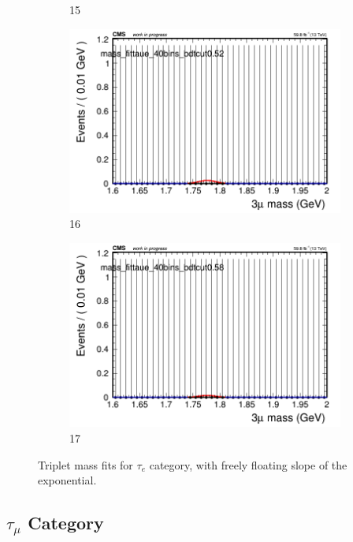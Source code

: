 \begin{figure}[h!]
\begin{subfigure}{0.2\textwidth}
        \caption{15}
    \end{subfigure}
    \begin{subfigure}{0.2\textwidth}
        \includegraphics[width=\textwidth]{power_law/plots/taue/massfit_taue_40bins_bdtcut0.52.png}
        \caption{16}
    \end{subfigure}
    \begin{subfigure}{0.2\textwidth}
        \includegraphics[width=\textwidth]{power_law/plots/taue/massfit_taue_40bins_bdtcut0.58.png}
        \caption{17}
    \end{subfigure}
    \caption{Triplet mass fits for $\tau_{e}$ category, with freely floating slope of the exponential.}
    \label{fig:unfixed_taue}
\end{figure}


\newpage

\subsection{$\tau_{\mu}$ Category}
\label{sec:taumu}

